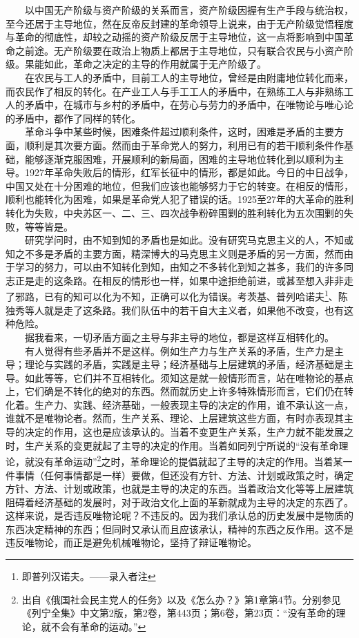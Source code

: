 \documentclass[cn,11pt,chinese]{elegantbook}
\begin{document}
　　以中国无产阶级与资产阶级的关系而言，资产阶级因握有生产手段与统治权，至今还居于主导地位，然在反帝反封建的革命领导上说来，由于无产阶级觉悟程度与革命的彻底性，却较之动摇的资产阶级反居于主导地位，这一点将影响到中国革命之前途。无产阶级要在政治上物质上都居于主导地位，只有联合农民与小资产阶级。果能如此，革命之决定的主导的作用就属于无产阶级了。\\
　　在农民与工人的矛盾中，目前工人的主导地位，曾经是由附庸地位转化而来，而农民作了相反的转化。在产业工人与手工工人的矛盾中，在熟练工人与非熟练工人的矛盾中，在城市与乡村的矛盾中，在劳心与劳力的矛盾中，在唯物论与唯心论的矛盾中，都作了同样的转化。\\
　　革命斗争中某些时候，困难条件超过顺利条件，这时，困难是矛盾的主要方面，顺利是其次要方面。然而由于革命党人的努力，利用已有的若干顺利条件作基础，能够逐渐克服困难，开展顺利的新局面，困难的主导地位转化到以顺利为主导。1927年革命失败后的情形，红军长征中的情形，都是如此。今日的中日战争，中国又处在十分困难的地位，但我们应该也能够努力于它的转变。在相反的情形，顺利也能转化为困难，如果是革命党人犯了错误的话。1925至27年的大革命的胜利转化为失败，中央苏区一、二、三、四次战争粉碎围剿的胜利转化为五次围剿的失败，等等皆是。\\
　　研究学问时，由不知到知的矛盾也是如此。没有研究马克思主义的人，不知或知之不多是矛盾的主要方面，精深博大的马克思主义则是矛盾的另一方面，然而由于学习的努力，可以由不知转化到知，由知之不多转化到知之甚多，我们的许多同志正是走的这条路。在相反的情形也一样，如果中途拒绝前进，或甚至想入非非走了邪路，已有的知可以化为不知，正确可以化为错误。考茨基、普列哈诺夫\footnote[8]{ 即普列汉诺夫。——录入者注}、陈独秀等人就是走了这条路。我们队伍中的若干自大主义者，如果他不改变，也有这种危险。\\
　　据我看来，一切矛盾方面之主导与非主导的地位，都是这样互相转化的。\\
　　有人觉得有些矛盾并不是这样。例如生产力与生产关系的矛盾，生产力是主导；理论与实践的矛盾，实践是主导；经济基础与上层建筑的矛盾，经济基础是主导。如此等等，它们并不互相转化。须知这是就一般情形而言，站在唯物论的基点上，它们确是不转化的绝对的东西。然而就历史上许多特殊情形而言，它们仍在转化着。生产力、实践、经济基础，一般表现主导的决定的作用，谁不承认这一点，谁就不是唯物论者。然而，生产关系、理论、上层建筑这些方面，有时亦表现其主导的决定的作用，这也是应该承认的。当着不变更生产关系，生产力就不能发展之时，生产关系的变更就起了主导的决定的作用。当着如同列宁所说的“没有革命理论，就没有革命运动”\footnote[9]{ 出自《俄国社会民主党人的任务》以及《怎么办？》第1章第4节。分别参见《列宁全集》中文第2版，第2卷，第443页；第6卷，第23页：“没有革命的理论，就不会有革命的运动。”}之时，革命理论的提倡就起了主导的决定的作用。当着某一件事情（任何事情都是一样）要做，但还没有方针、方法、计划或政策之时，确定方针、方法、计划或政策，也就是主导的决定的东西。当着政治文化等等上层建筑阻碍着经济基础的发展时，对于政治文化上面的革新就成为主导的决定的东西了。这样来说，是否违反唯物论呢？不违反的。因为我们承认总的历史发展中是物质的东西决定精神的东西；但同时又承认而且应该承认，精神的东西之反作用。这不是违反唯物论，而正是避免机械唯物论，坚持了辩证唯物论。\\
\end{document}
